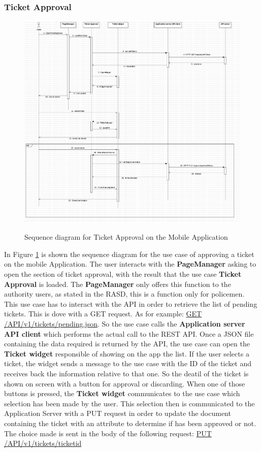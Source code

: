 \subsubsection{Ticket Approval}%
\begin{figure}[H]
\centering
\includegraphics[width=\textwidth]{Images/DDSeqAppTick.png}
\caption{\label{fig:DDSeqAppTick}} Sequence diagram for Ticket Approval on the Mobile Application
\end{figure}
In Figure \ref{fig:DDSeqAppTick} is shown the sequence diagram for the use case of approving a ticket on the mobile Application.
The user interacts with the \textbf{PageManager} asking to open the section of ticket approval, with the result that the use case \textbf{Ticket Approval} is loaded. The \textbf{PageManager} only offers this function to the authority users, as stated in the RASD, this is a function only for policemen. This use case has to interact with the API in order to retrieve the list of pending tickets. This is dove with a GET request. As for example: \url{GET} \url{/API/v1/tickets/pending.json}. So the use case calls the \textbf{Application server API client} which performs the actual call to the REST API. Once a JSON file containing the data required is returned by the API, the use case can open the \textbf{Ticket widget} responsible of showing on the app the list.
If the user selects a ticket, the widget sends a message to the use case with the ID of the ticket and receives back the information relative to that one. So the deatil of the ticket is shown on screen with a button for approval or discarding. When one of those buttons is pressed, the \textbf{Ticket widget} communicates to the use case which selection has been made by the user. This selection then is communicated to the Application Server with a PUT request in order to update the document containing the ticket with an attribute to determine if has been approved or not. The choice made is sent in the body of the following request: \url{PUT} \url{/API/v1/tickets/ticketid}
